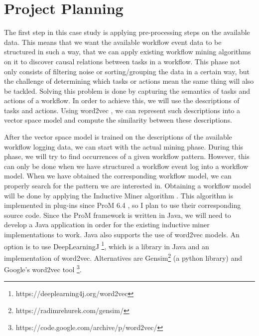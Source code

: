 \documentclass[a4paper,11pt]{article}
\begin{document}




\section{Project Planning}
The first step in this case study is applying pre-processing steps on the available data. This means that we want the available workflow event data to be structured in such a way, that we can apply existing workflow mining algorithms on it to discover causal relations between tasks in a workflow. This phase not only consists of filtering noise or sorting/grouping the data in a certain way, but the challenge of determining which tasks or actions mean the same thing will also be tackled. Solving this problem is done by capturing the semantics of tasks and actions of a workflow. In order to achieve this, we will use the descriptions of tasks and actions. Using word2vec \cite{Mikolov2013a,Mikolov2013b}, we can represent such descriptions into a vector space model and compute the similarity between these descriptions.

After the vector space model is trained on the descriptions of the available workflow logging data, we can start with the actual mining phase. During this phase, we will try to find occurrences of a given workflow pattern. However, this can only be done when we have structured a workflow event log into a workflow model. When we have obtained the corresponding workflow model, we can properly search for the pattern we are interested in. Obtaining a workflow model will be done by applying the Inductive Miner algorithm \cite{InductiveMiner2013}. This algorithm is implemented in plug-ins since ProM 6.4 \cite{InductiveVisualMiner2014}, so I plan to use their corresponding source code. Since the ProM framework is written in Java, we will need to develop a Java application in order for the existing inductive miner implementations to work. Java also supports the use of word2vec models. An option is to use DeepLearningJ \footnote{https://deeplearning4j.org/word2vec}, which is a library in Java and an implementation of word2vec. Alternatives are Gensim\footnote{https://radimrehurek.com/gensim/} (a python library) and Google's word2vec tool \footnote{https://code.google.com/archive/p/word2vec/}. 
\end{document}
